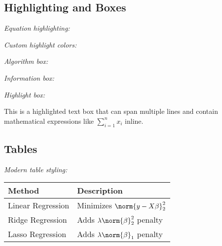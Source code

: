 \subsection{Highlighting and Boxes}

\emph{Equation highlighting:}\\

\emph{Custom highlight colors:}\\

\emph{Algorithm box:}\\

\emph{Information box:}\\

\emph{Highlight box:}\\
\begin{highlightbox*}[LightCyan]
    This is a highlighted text box that can span multiple lines and contain 
    mathematical expressions like $\sum_{i=1}^n x_i$ inline.
\end{highlightbox*}

\subsection{Tables}

\emph{Modern table styling:}
\begin{center}
\def\arraystretch{1.2}
\begin{tabularx}{0.9\linewidth}{@{}lX@{}}
    \toprule
    \textbf{Method} & \textbf{Description} \\
    \midrule
    Linear Regression & Minimizes $\norm{y - X\beta}_2^2$ \\
    Ridge Regression & Adds $\lambda \norm{\beta}_2^2$ penalty \\
    Lasso Regression & Adds $\lambda \norm{\beta}_1$ penalty \\
    \bottomrule
\end{tabularx}
\end{center}

